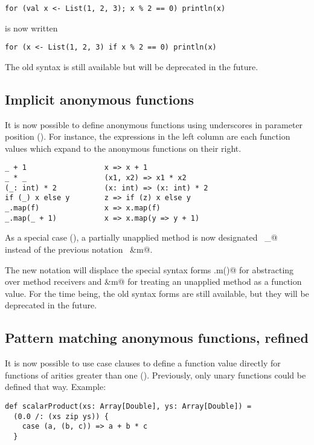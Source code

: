 \begin{lstlisting}
for (val x <- List(1, 2, 3); x % 2 == 0) println(x)
\end{lstlisting}

is now written

\begin{lstlisting}
for (x <- List(1, 2, 3) if x % 2 == 0) println(x)
\end{lstlisting}

The old syntax is still available but will be deprecated in the
future. 

\subsection*{Implicit anonymous functions}

It is now possible to define anonymous functions 
using underscores in parameter position ().
For instance, 
the expressions in the left column are each function values which 
expand to the anonymous functions on their right.
\begin{lstlisting}
_ + 1                  x => x + 1
_ * _                  (x1, x2) => x1 * x2
(_: int) * 2           (x: int) => (x: int) * 2
if (_) x else y        z => if (z) x else y
_.map(f)               x => x.map(f)
_.map(_ + 1)           x => x.map(y => y + 1)
\end{lstlisting}
As a special case (), a partially unapplied method is now designated
~\lstinline@m _@~~ instead of the previous notation ~\lstinline@&m@.

The new notation will displace the special syntax forms
\lstinline@.m()@ for abstracting over method receivers and
\lstinline@&m@ for treating an unapplied method as a function value.
For the time being, the old syntax forms are still available, 
but they will be deprecated in the future.

\subsection*{Pattern matching anonymous functions, refined}

It is now possible to use case clauses to define a function value
directly for functions of arities greater than one
().  Previously, only unary functions could
be defined that way. Example:
\begin{lstlisting}
def scalarProduct(xs: Array[Double], ys: Array[Double]) = 
  (0.0 /: (xs zip ys)) {
    case (a, (b, c)) => a + b * c
  }
\end{lstlisting}

